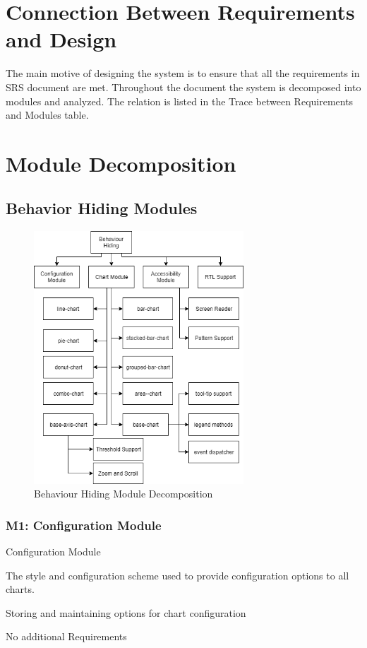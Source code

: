 \documentclass[12pt, titlepage]{article}
\begin{document}
\section{Connection Between Requirements and Design}
The main motive of designing the system is to ensure that all the requirements in SRS document are met. Throughout the document the system is decomposed into modules and analyzed. The relation is listed in the Trace between Requirements and Modules table.

\section{Module Decomposition}

\subsection{Behavior Hiding Modules}
\begin{figure}[H]
\centering
\includegraphics[width=0.7\textwidth]{behave.png}
\caption{Behaviour Hiding Module Decomposition}
\label{FigUH}
\end{figure}


\subsubsection{M1: Configuration Module}
\begin{description}[style=nextline]
\item[Type:] Configuration Module
\item[Secrets:] The style and configuration scheme used to provide configuration options to all charts. 
\item[Responsibilities:] Storing and maintaining options for chart configuration 
\item[Requirements:] No additional Requirements
\end{description}
\end{document}
